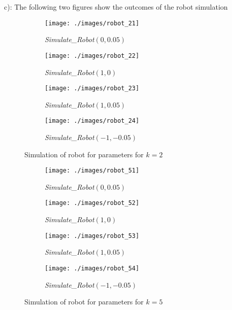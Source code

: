 \FloatBarrier
\newpage

c): The following two figures show the outcomes of the robot simulation

\begin{figure}[hb]
	\centering
	\begin{subfigure}[b]{.45\linewidth}
	\texttt{[image: ./images/robot\_21]}
	\caption{\textit{Simulate\_Robot}$(0, 0.05)$}\label{fig:robot_simulation_2}
	\end{subfigure}
	\begin{subfigure}[b]{.45\linewidth}
	\texttt{[image: ./images/robot\_22]}
	\caption{\textit{Simulate\_Robot}$(1, 0)$}\label{fig:robot_simulation_3}
	\end{subfigure}
	\begin{subfigure}[b]{.45\linewidth}
	\texttt{[image: ./images/robot\_23]}
	\caption{\textit{Simulate\_Robot}$(1, 0.05)$}\label{fig:robot_simulation_4}
	\end{subfigure}
	\begin{subfigure}[b]{.45\linewidth}
	\texttt{[image: ./images/robot\_24]}
	\caption{\textit{Simulate\_Robot}$(-1, -0.05)$}\label{fig:robot_simulation_5}
	\end{subfigure}
\caption{Simulation of robot for parameters for $k = 2$}
\label{fig:robot_simulations}
\end{figure}

\begin{figure}[hb]
	\centering
	\begin{subfigure}[b]{.45\linewidth}
	\texttt{[image: ./images/robot\_51]}
	\caption{\textit{Simulate\_Robot}$(0, 0.05)$}\label{fig:robot_simulation_2}
	\end{subfigure}
	\begin{subfigure}[b]{.45\linewidth}
	\texttt{[image: ./images/robot\_52]}
	\caption{\textit{Simulate\_Robot}$(1, 0)$}\label{fig:robot_simulation_3}
	\end{subfigure}
	\begin{subfigure}[b]{.45\linewidth}
	\texttt{[image: ./images/robot\_53]}
	\caption{\textit{Simulate\_Robot}$(1, 0.05)$}\label{fig:robot_simulation_4}
	\end{subfigure}
	\begin{subfigure}[b]{.45\linewidth}
	\texttt{[image: ./images/robot\_54]}
	\caption{\textit{Simulate\_Robot}$(-1, -0.05)$}\label{fig:robot_simulation_5}
	\end{subfigure}

	\caption{Simulation of robot for parameters for $k = 5$}
	\label{fig:robot_simulations}
\end{figure}

